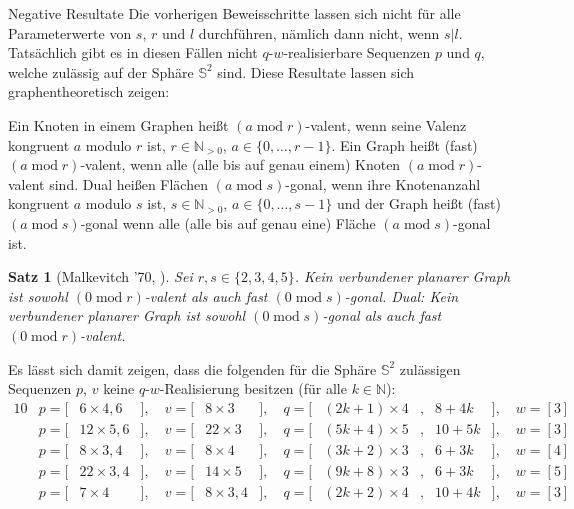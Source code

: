 \documentclass[10pt, notheorems]{beamer}
\newtheorem{theorem}{Satz}[section]
\newcommand{\set}[1]{\{ #1 \}}
\newcommand{\nats}{\mathbb{N}}
\newcommand{\sphere}{\mathbb{S}}
\renewcommand{\mod}{\operatorname{mod}}
\newcommand{\hdef}[1]{\textcolor{darkred2}{#1}}
\begin{document}
\begin{frame}{Negative Resultate}
  Die vorherigen Beweisschritte lassen sich nicht für alle Parameterwerte von $s$, $r$ und $l$ durchführen, nämlich dann nicht, wenn $s | l$. Tatsächlich gibt es in diesen Fällen nicht $q$-$w$-realisierbare Sequenzen $p$ und $q$, welche zulässig auf der Sphäre $\sphere^2$ sind. Diese Resultate lassen sich graphentheoretisch zeigen:

  \begin{definition} Ein Knoten in einem Graphen heißt \hdef{$(a \mod r)$-valent}, wenn seine Valenz kongruent $a$ modulo $r$ ist, $r \in \nats_{>0}$, $a \in \set{0, \dots, r - 1}$. Ein Graph heißt (fast) $(a \mod r)$-valent, wenn alle (alle bis auf genau einem) Knoten $(a \mod r)$-valent sind. Dual heißen Flächen \hdef{$(a \mod s)$-gonal}, wenn ihre Knotenanzahl kongruent $a$ modulo $s$ ist, $s \in \nats_{>0}$, $a \in \set{0, \dots, s - 1}$ und der Graph heißt (fast) $(a \mod s)$-gonal wenn alle (alle bis auf genau eine) Fläche  $(a \mod s)$-gonal ist.
  \end{definition}
  
  \begin{theorem}[Malkevitch '70, \cite{malkevitch1970properties}] Sei $r, s \in \set{2, 3, 4, 5}$. Kein verbundener planarer Graph ist sowohl $(0 \mod r)$-valent als auch fast $(0 \mod s)$-gonal. Dual: Kein verbundener planarer Graph ist sowohl $(0 \mod s)$-gonal als auch fast $(0 \mod r)$-valent.
  \end{theorem}
\end{frame}

\begin{frame}
  \begin{example}
    Es lässt sich damit zeigen, dass die folgenden für die Sphäre $\sphere^2$ zulässigen Sequenzen $p$, $v$ keine $q$-$w$-Realisierung besitzen (für alle $k \in \nats$):
    \begin{alignat*}{10}
      &p = [& 6 \times 4, 6&], \quad v = [& 8 \times 3   &], \quad q = [&(2k + 1) \times 4&,{} & 8 + 4k&], \quad w = [3]\\
      &p = [&12 \times 5, 6&], \quad v = [&22 \times 3   &], \quad q = [&(5k + 4) \times 5&,{} &10 + 5k&], \quad w = [3]\\
      &p = [& 8 \times 3, 4&], \quad v = [& 8 \times 4   &], \quad q = [&(3k + 2) \times 3&,{} & 6 + 3k&], \quad w = [4]\\
      &p = [&22 \times 3, 4&], \quad v = [&14 \times 5   &], \quad q = [&(9k + 8) \times 3&,{} & 6 + 3k&], \quad w = [5]\\
      &p = [& 7 \times 4   &], \quad v = [& 8 \times 3, 4&], \quad q = [&(2k + 2) \times 4&,{} &10 + 4k&], \quad w = [3]
    \end{alignat*}
    
  \end{example}
\end{frame}
\end{document}
